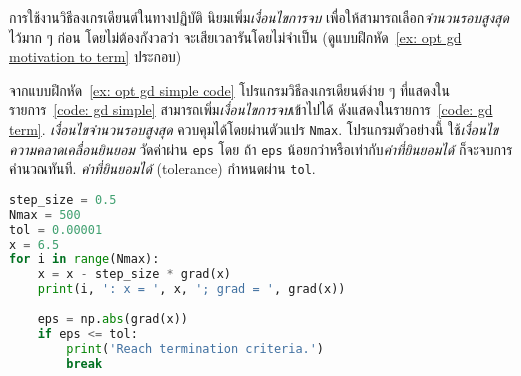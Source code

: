 \begin{Exercise}
	\label{ex: opt gd termination code}
	การใช้งานวิธีลงเกรเดียนต์ในทางปฏิบัติ นิยมเพิ่ม\textit{เงื่อนไขการจบ}
	เพื่อให้สามารถเลือก\textit{จำนวนรอบสูงสุด}ไว้มาก ๆ ก่อน
	โดยไม่ต้องกังวลว่า จะเสียเวลารันโดยไม่จำเป็น (ดูแบบฝึกหัด~\ref{ex: opt gd motivation to term} ประกอบ)
	
	จากแบบฝึกหัด~\ref{ex: opt gd simple code}
	โปรแกรมวิธีลงเกรเดียนต์ง่าย ๆ ที่แสดงในรายการ~\ref{code: gd simple}
	สามารถเพิ่ม\textit{เงื่อนไขการจบ}เข้าไปได้
	ดังแสดงในรายการ~\ref{code: gd term}.
	\textit{เงื่อนไขจำนวนรอบสูงสุด} ควบคุมได้โดยผ่านตัวแปร \texttt{Nmax}.
	โปรแกรมตัวอย่างนี้ ใช้\textit{เงื่อนไขความคลาดเคลื่อนยินยอม} 
	วัดค่าผ่าน \texttt{eps}
	โดย 
	ถ้า \texttt{eps} น้อยกว่าหรือเท่ากับ\textit{ค่าที่ยินยอมได้}
	ก็จะจบการคำนวณทันที.
	\textit{ค่าที่ยินยอมได้} (tolerance)  %
	กำหนดผ่าน \texttt{tol}.
	
	\begin{lstlisting}[language=Python, caption={[วิธีลงเกรเดียนต์ที่มีเงื่อนไขการจบ]ตัวอย่างโปรแกรม วิธีลงเกรเดียนต์ที่มีเงื่อนไขการจบด้วยความคลาดเคลื่อนที่ยินยอมได้},
	label={code: gd term}]
step_size = 0.5
Nmax = 500
tol = 0.00001
x = 6.5
for i in range(Nmax):
    x = x - step_size * grad(x)    
    print(i, ': x = ', x, '; grad = ', grad(x))
	
    eps = np.abs(grad(x))
    if eps <= tol:
        print('Reach termination criteria.')
        break
	\end{lstlisting}
	
	
	

\end{Exercise}
